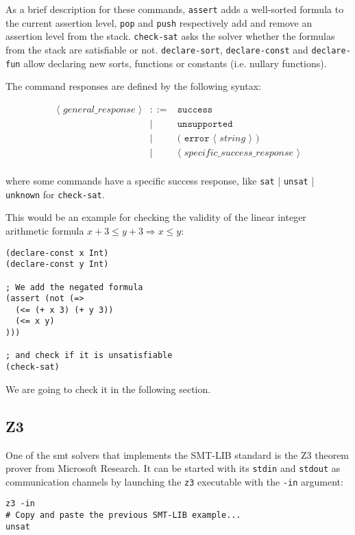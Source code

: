 As a brief description for these commands, \verb|assert| adds a well-sorted
formula to the current assertion level, \verb|pop| and \verb|push| respectively
add and remove an assertion level from the stack. \verb|check-sat| asks the
solver whether the formulas from the stack are satisfiable or not.
\verb|declare-sort|, \verb|declare-const| and \verb|declare-fun| allow declaring
new sorts, functions or constants (i.e.  nullary functions).

The command responses are defined by the following syntax:

\[
\begin{array}{rcll}
\langle\textit{ general\_response }\rangle & ::= & \texttt{success}\\
& | & \texttt{unsupported}\\
& | & \texttt{( error } \langle\textit{ string }\rangle \texttt{ ) }\\
& | & \langle\textit{ specific\_success\_response }\rangle\\
\end{array}
\]

where some commands have a specific success response, like \verb|sat| |
\verb|unsat| | \verb|unknown| for \verb|check-sat|.

This would be an example for checking the validity of the linear integer 
arithmetic formula $x + 3 \leq y + 3 \Rightarrow x \leq y$:

\begin{verbatim}
(declare-const x Int)
(declare-const y Int)

; We add the negated formula
(assert (not (=> 
  (<= (+ x 3) (+ y 3)) 
  (<= x y)
)))

; and check if it is unsatisfiable
(check-sat)
\end{verbatim}

We are going to check it in the following section.

\subsection{Z3}

One of the \acrshort{smt} solvers that implements the SMT-LIB standard is the Z3
theorem prover from Microsoft Research. It can be started with its \verb|stdin|
and \verb|stdout| as communication channels by launching the \verb|z3|
executable with the \verb|-in| argument:

\begin{verbatim}
z3 -in 
# Copy and paste the previous SMT-LIB example...
unsat
\end{verbatim}

